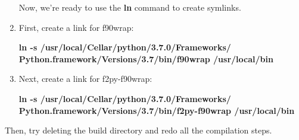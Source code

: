 \begin{enumerate}
Now, we're ready to use the \textbf{ln} command to create symlinks. 

\item First, create a link for f90wrap:

\begin{center}
\textbf{ln -s /usr/local/Cellar/python/3.7.0/Frameworks/ \\
Python.framework/Versions/3.7/bin/f90wrap /usr/local/bin} \\
\end{center}

\item Next, create a link for f2py-f90wrap:

\begin{center}
\textbf{ln -s /usr/local/Cellar/python/3.7.0/Frameworks/ \\
Python.framework/Versions/3.7/bin/f2py-f90wrap /usr/local/bin} \\
\end{center}

\end{enumerate}

Then, try deleting the build directory and redo all the compilation steps. 